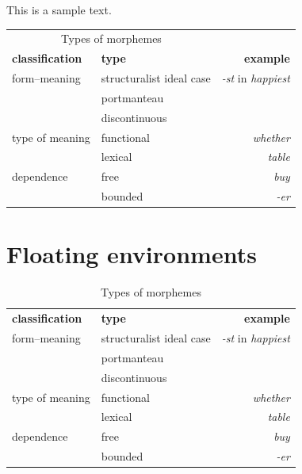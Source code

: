 \documentclass[10pt, paper=a4, abstracton]{scrartcl}
\begin{document}
This is a sample text. 
\begin{tabular}[t]{llr}
	\multicolumn{2}{c}{Types of morphemes} &  \\
	\cline{1-2}
	\textbf{classification} & \textbf{type} & \textbf{example}\\
	\cline{1-2}
	form--meaning & structuralist ideal case & \emph{-st} in \emph{happiest}\\
	& portmanteau & \\
	& discontinuous & \\
	\cline{1-2}
	type of meaning & functional & \emph{whether} \\
	& lexical & \emph{table} \\
	\cline{1-2}
	dependence & free & \emph{buy} \\
	& bounded & \emph{-er}\\
\end{tabular}

\blindtext 


\section{Floating environments}

\blindtext 

\begin{table}[htbp]

\centering

\begin{tabular}[t]{llr}
	\textbf{classification} & \textbf{type} & \textbf{example}\\
	\cline{1-2}
	form--meaning & structuralist ideal case & \emph{-st} in \emph{happiest}\\
	& portmanteau & \\
	& discontinuous & \\
	\cline{1-2}
	type of meaning & functional & \emph{whether} \\
	& lexical & \emph{table} \\
	\cline{1-2}
	dependence & free & \emph{buy} \\
	& bounded & \emph{-er}\\
\end{tabular}

\caption{Types of morphemes}	
\end{table}
\end{document}
